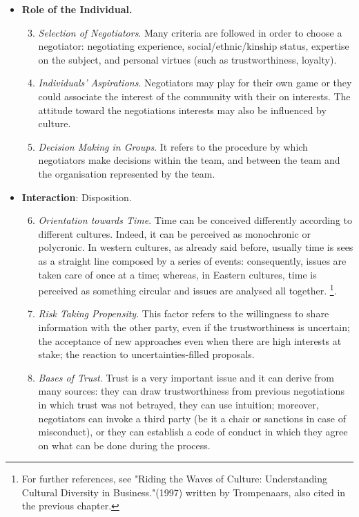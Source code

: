 \documentclass[../main.tex]{subfiles}
\begin{document}
\begin{itemize}
\begin{enumerate}
    \end{enumerate}
    
    \item \textbf{Role of the Individual.}
    \begin{enumerate}
        \setcounter{enumi}{2}
        
        \item \textit{Selection of Negotiators}. Many criteria are followed in order to choose a negotiator: negotiating experience, social/ethnic/kinship status, expertise on the subject, and personal virtues (such as trustworthiness, loyalty). 
        \item \textit{Individuals' Aspirations}. Negotiators may play for their own game or they could associate the interest of the community with their on interests. The attitude toward the negotiations interests may also be influenced by culture.
        \item \textit{Decision Making in Groups}. It refers to the procedure by which negotiators make decisions within the team, and between the team and the organisation represented by the team.
    \end{enumerate}
    
    \item \textbf{Interaction}: Disposition.
    \begin{enumerate}
        \setcounter{enumi}{5}
        
        \item \textit{Orientation towards Time}. Time can be conceived differently according to different cultures. Indeed, it can be perceived as monochronic or polycronic. In western cultures, as already said before, usually time is sees as a straight line composed by a series of events: consequently, issues are taken care of once at a time; whereas, in Eastern cultures, time is perceived as something circular and issues are analysed all together. \footnote{For further references, see "Riding the Waves of Culture: Understanding Cultural Diversity in Business."(1997) written by Trompenaars, also cited in the previous chapter.}.
        \item \textit{Risk Taking Propensity}. This factor refers to the willingness to share information with the other party, even if the trustworthiness is uncertain; the acceptance of new approaches even when there are high interests at stake; the reaction to uncertainties-filled proposals.
        \item \textit{Bases of Trust}. Trust is a very important issue and it can derive from many sources: they can draw trustworthiness from previous negotiations in which trust was not betrayed, they can use intuition; moreover, negotiators can invoke a third party (be it a chair or sanctions in case of misconduct), or they can establish a code of conduct in which they agree on what can be done during the process.
    \end{enumerate}
    

\end{itemize}
\end{document}
